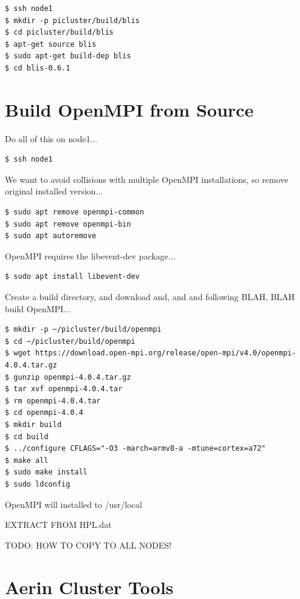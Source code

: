 \documentclass{report}
\begin{document}
\lstset{style=type}
\begin{lstlisting}
$ ssh node1
$ mkdir -p picluster/build/blis
$ cd picluster/build/blis
$ apt-get source blis
$ sudo apt-get build-dep blis
$ cd blis-0.6.1
\end{lstlisting}


%
%

\chapter{Build OpenMPI from Source}

Do all of this on node1...

\lstset{style=type}
\begin{lstlisting}
$ ssh node1
\end{lstlisting}

We want to avoid collisions with multiple OpenMPI installations, so remove original installed version...

\lstset{style=type}
\begin{lstlisting}
$ sudo apt remove openmpi-common
$ sudo apt remove openmpi-bin
$ sudo apt autoremove 
\end{lstlisting}

OpenMPI requires the libevent-dev package...

\lstset{style=type}
\begin{lstlisting}
$ sudo apt install libevent-dev
\end{lstlisting}

Create a build directory, and download and, and and following BLAH, BLAH build OpenMPI...

\lstset{style=type}
\begin{lstlisting}
$ mkdir -p ~/picluster/build/openmpi
$ cd ~/picluster/build/openmpi
$ wget https://download.open-mpi.org/release/open-mpi/v4.0/openmpi-4.0.4.tar.gz
$ gunzip openmpi-4.0.4.tar.gz
$ tar xvf openmpi-4.0.4.tar
$ rm openmpi-4.0.4.tar
$ cd openmpi-4.0.4
$ mkdir build
$ cd build
$ ../configure CFLAGS="-O3 -march=armv8-a -mtune=cortex=a72"
$ make all
$ sudo make install
$ sudo ldconfig
\end{lstlisting}

OpenMPI will installed to /usr/local

EXTRACT FROM HPL.dat


TODO: HOW TO COPY TO ALL NODES!


%
%
\chapter{Aerin Cluster Tools}
\end{document}
